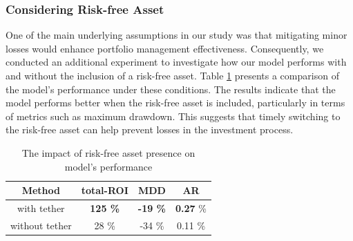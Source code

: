\subsubsection{Considering Risk-free Asset}
One of the main underlying assumptions in our study was that mitigating minor losses would enhance portfolio management effectiveness. Consequently, we conducted an additional experiment to investigate how our model performs with and without the inclusion of a risk-free asset. Table \ref{tbl:rf1} presents a comparison of the model's performance under these conditions. The results indicate that the model performs better when the risk-free asset is included, particularly in terms of metrics such as maximum drawdown. This suggests that timely switching to the risk-free asset can help prevent losses in the investment process.

\begin{table}[h]
	\centering
	\caption{The impact of risk-free asset presence on model's performance}
	\label{tbl:rf1}
	\begin{tabular}{c | c | c | c  }
		Method & total-ROI & MDD & AR \\
		\hline
		\hline
		with tether & \textbf{125 \%}  & \textbf{-19 \%} & \textbf{0.27}  \% \\
		without tether & 28 \% & -34 \% & 0.11 \% \\
	\end{tabular}
\end{table}

%

